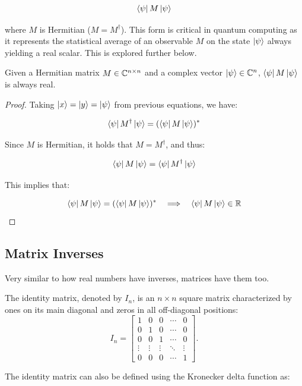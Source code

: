 \documentclass[12pt]{article}
\begin{document}
$$\bra{\psi} M \ket{\psi}$$

where $M$ is Hermitian ($M = M^\dagger$). This form is critical in quantum computing as it represents the statistical average of an observable $M$ on the state $\ket{\psi}$ always yielding a real scalar. This is explored further below. 

\begin{theorem}
    Given a Hermitian matrix $M \in \mathbb{C}^{n \times n}$ and a complex vector $\ket{\psi} \in \mathbb{C}^n$, $\bra{\psi} M \ket{\psi}$ is always real. 
\end{theorem}

\begin{proof}
    Taking $\ket{x} = \ket{y} = \ket{\psi}$ from previous equations, we have:

    $$\bra{\psi} M^\dagger \ket{\psi} = (\bra{\psi} M \ket{\psi})^*$$
    
    Since $M$ is Hermitian, it holds that $M = M^\dagger$, and thus:

    $$\bra{\psi} M \ket{\psi} = \bra{\psi} M^\dagger \ket{\psi}$$
    
    This implies that:

    $$\bra{\psi} M \ket{\psi} = (\bra{\psi} M \ket{\psi})^* \quad \Longrightarrow \quad \bra{\psi} M \ket{\psi} \in \mathbb{R}$$
\end{proof}

\subsection{Matrix Inverses}

Very similar to how real numbers have inverses, matrices have them too. 

\begin{definition}
    The identity matrix, denoted by $I_{n}$, is an $n \times n$ square matrix characterized by ones on its main diagonal and zeros in all off-diagonal positions:
    \[
        I_{n} =
        \begin{bmatrix}
        1      & 0      & 0      & \cdots & 0 \\
        0      & 1      & 0      & \cdots & 0 \\
        0      & 0      & 1      & \cdots & 0 \\
        \vdots & \vdots & \vdots & \ddots & \vdots \\
        0      & 0      & 0      & \cdots & 1
        \end{bmatrix}.
    \]
\end{definition}


The identity matrix can also be defined using the Kronecker delta function as:
\end{document}
